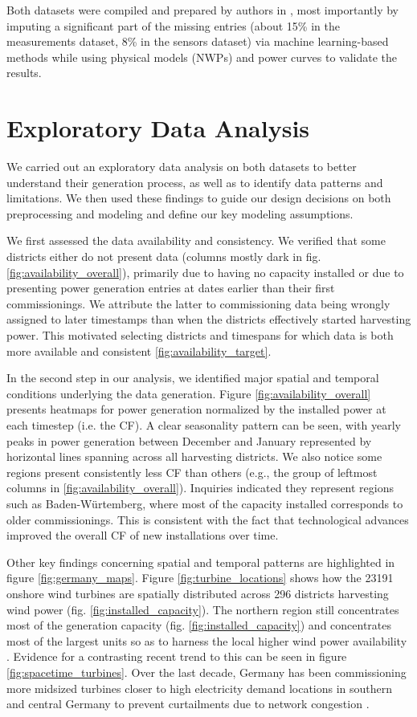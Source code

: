 Both datasets were compiled and prepared by authors in \cite{becker2017completion}, most importantly by imputing a significant part of the missing entries (about 15\% in the measurements dataset, 8\% in the sensors dataset) via machine learning-based methods while using physical models (NWPs) and power curves to validate the results.

\section{Exploratory Data Analysis}\label{sec:eda}
We carried out an exploratory data analysis on both datasets to better understand their generation process, as well as to identify data patterns and limitations.
We then used these findings to guide our design decisions on both preprocessing and modeling and define our key modeling assumptions.

We first assessed the data availability and consistency.
We verified that some districts either do not present data (columns mostly dark in fig. \ref{fig:availability_overall}), primarily due to having no capacity installed or due to presenting power generation entries at dates earlier than their first commissionings.
We attribute the latter to commissioning data being wrongly assigned to later timestamps than when the districts effectively started harvesting power.
This motivated selecting districts and timespans for which data is both more available and consistent \ref{fig:availability_target}.

In the second step in our analysis, we identified major spatial and temporal conditions underlying the data generation.
Figure \ref{fig:availability_overall} presents heatmaps for power generation normalized by the installed power at each timestep (i.e. the CF).
A clear seasonality pattern can be seen, with yearly peaks in power generation between December and January represented by horizontal lines spanning across all harvesting districts.
We also notice some regions present consistently less CF than others (e.g., the group of leftmost columns in \ref{fig:availability_overall}).
Inquiries indicated they represent regions such as Baden-Würtemberg, where most of the capacity installed corresponds to older commissionings.
This is consistent with the fact that technological advances improved the overall CF of new installations over time.

Other key findings concerning spatial and temporal patterns are highlighted in figure \ref{fig:germany_maps}.
Figure \ref{fig:turbine_locations} shows how the 23191 onshore wind turbines are spatially distributed across 296 districts harvesting wind power (fig. \ref{fig:installed_capacity}).
The northern region still concentrates most of the generation capacity (fig. \ref{fig:installed_capacity}) and concentrates most of the largest units so as to harness the local higher wind power availability \cite{windatlas}.
Evidence for a contrasting recent trend to this can be seen in figure \ref{fig:spacetime_turbines}.
Over the last decade, Germany has been commissioning more midsized turbines closer to high electricity demand locations in southern and central Germany to prevent curtailments due to network congestion \cite{engeland2017variability}.

